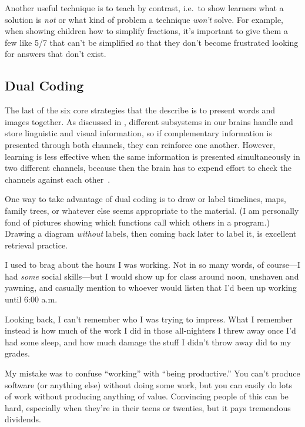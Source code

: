 Another useful technique is to teach by contrast,
i.e.\ to show learners what a solution is \emph{not}
or what kind of problem a technique \emph{won't} solve.
For example,
when showing children how to simplify fractions,
it's important to give them a few like 5/7 that can't be simplified
so that they don't become frustrated looking for answers that don't exist.

\subsection*{Dual Coding}

The last of the six core strategies
that the  describe
is to present words and images together.
As discussed in ,
different subsystems in our brains handle and store linguistic and visual information,
so if complementary information is presented through both channels,
they can reinforce one another.
However,
learning is less effective when the same information is presented simultaneously in two different channels,
because then the brain has to expend effort to check the channels against each other~\cite{Maye2003}.

One way to take advantage of dual coding is to draw or label timelines,
maps, family trees,
or whatever else seems appropriate to the material.
(I am personally fond of pictures showing which functions call which others in a program.)
Drawing a diagram \emph{without} labels,
then coming back later to label it,
is excellent retrieval practice.


I used to brag about the hours I was working.
Not in so many words,
of course---I had \emph{some} social skills---but
I would show up for class around noon,
unshaven and yawning,
and casually mention to whoever would listen
that I'd been up working until 6:00 a.m.

Looking back,
I can't remember who I was trying to impress.
What I remember instead is
how much of the work I did in those all-nighters I threw away once I'd had some sleep,
and how much damage the stuff I didn't throw away did to my grades.

My mistake was to confuse ``working'' with ``being productive.''
You can't produce software (or anything else) without doing some work,
but you can easily do lots of work without producing anything of value.
Convincing people of this can be hard,
especially when they're in their teens or twenties,
but it pays tremendous dividends.


